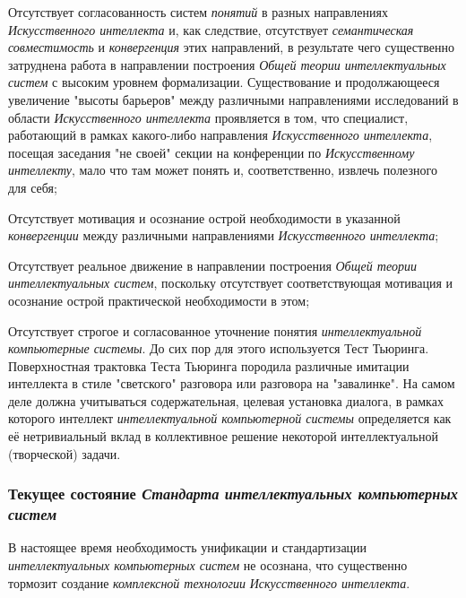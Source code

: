 \begin{textitemize}
	\item
	Отсутствует согласованность систем \textit{понятий} в разных направлениях \textit{Искусственного интеллекта} и, как следствие, отсутствует \textit{семантическая совместимость} и \textit{конвергенция} этих направлений, в результате чего существенно затруднена работа в направлении построения \textit{Общей теории интеллектуальных систем} с высоким уровнем формализации. Существование и продолжающееся увеличение "высоты барьеров" между различными направлениями исследований в области \textit{Искусственного интеллекта} проявляется в том, что специалист, работающий в рамках какого-либо направления \textit{Искусственного интеллекта}, посещая заседания "не своей" секции на конференции по \textit{Искусственному интеллекту}, мало что там может понять и, соответственно, извлечь полезного для себя;
	\item
	Отсутствует мотивация и осознание острой необходимости в указанной \textit{конвергенции} между различными направлениями \textit{Искусственного интеллекта};
	\item
	Отсутствует реальное движение в направлении построения \textit{Общей теории интеллектуальных систем}, поскольку отсутствует соответствующая мотивация и осознание острой практической необходимости в этом;
	\item
	Отсутствует строгое и согласованное уточнение понятия \textit{интеллектуальной компьютерные системы}. До сих пор для этого используется Тест Тьюринга. Поверхностная трактовка Теста Тьюринга породила различные имитации интеллекта в стиле "светского"{} разговора или разговора на "завалинке"{}. На самом деле должна учитываться содержательная, целевая установка диалога, в рамках которого интеллект \textit{интеллектуальной компьютерной системы} определяется как её нетривиальный вклад в коллективное решение некоторой интеллектуальной (творческой) задачи.
\end{textitemize}

\subsubsection{Текущее состояние \textbf{\textit{Стандарта}} \textbf{\textit{интеллектуальных компьютерных систем}}}

В настоящее время необходимость унификации и стандартизации \textit{интеллектуальных компьютерных систем} не осознана, что существенно тормозит создание \textit{комплексной технологии} \textit{Искусственного интеллекта}.

